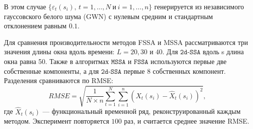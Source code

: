 \documentclass[12pt, specialist, subf
]{disser}
\theoremstyle{definition}
\newcommand{\MSSA}{\texttt{MSSA}}
\newcommand{\FSSA}{\texttt{FSSA}}
\newcommand{\DSSA}{\texttt{2d-SSA}}
\begin{document}
В этом случае $\{\varepsilon_t(s_i), \, t=1,\ldots, N\ \text{и}\ i=1,\ldots,n \}$ генерируется из независимого гауссовского белого шума (GWN) с нулевым средним и стандартным отклонением равным $0.1$.

Для сравнения производительности методов FSSA и MSSA рассматриваются три значения длины окна вдоль времени: $L=20, 30$ и $40$. Для $\DSSA$ вдоль s длина окна равна 50. Также в алгоритмах $\MSSA$ и $\FSSA$ используются первые две собственные компоненты, а для $\DSSA$ первые 8 собственных компонент. Разделения сравниваются по RMSE:
\[RMSE= \sqrt {\frac{1}{N\times n}\sum\limits_{t=1}^N \sum_{i=1}^n \left(X_t(s_i)-\hat{X}_t(s_i)\right)^2},\]
где $\hat{X}_t(s_i)$ — функциональный временной ряд, реконструированный каждым методом. Эксперимент повторяется $100$ раз, и считается среднее значение RMSE.
\end{document}
